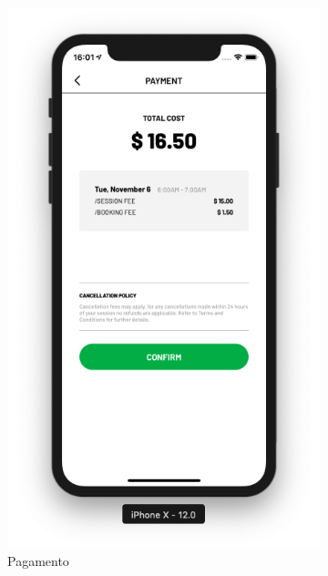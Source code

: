 \begin{figure}[H]
\begin{subfigure}[b]{0.3\textwidth}
        \includegraphics[width=\textwidth]{pfc/figuras/tr-booking-payment.png}
        \caption{Pagamento}
        \label{fig:tr-booking-payment}
    \end{subfigure}
    ~
    \begin{subfigure}[b]{0.3\textwidth}

\end{subfigure}
\end{figure}

